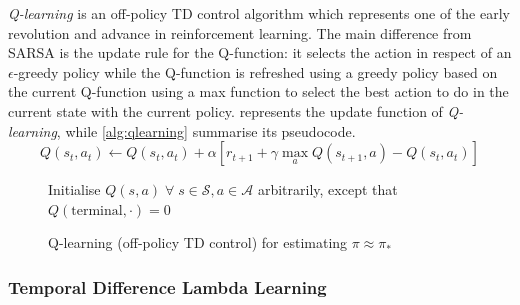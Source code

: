 \textit{Q-learning} \cite{watkins1989learning} is an off-policy TD control algorithm which represents one of the early revolution and advance in reinforcement learning.
The main difference from SARSA is the update rule for the Q-function: it selects the action in respect of an $\epsilon$-greedy policy while the Q-function is refreshed using a greedy policy based on the current Q-function using a max function to select the best action to do in the current state with the current policy.
 represents the update function of \textit{Q-learning}, while \vref{alg:qlearning} summarise its pseudocode.
\begin{equation}\label{eq:qlearning}
	Q(s_t, a_t) \leftarrow Q(s_t, a_t) + \alpha [r_{t+1} + \gamma \max_{a}{Q(s_{t+1}, a)} - Q(s_t, a_t)]
\end{equation}
\begin{figure}

	\begin{algorithm}[H]
		\SetAlgoLined
		\DontPrintSemicolon
		\LinesNumbered
		\KwIn{step size $\alpha \in (0,1]$, small $\epsilon > 0$\;}
		Initialise $Q(s,a) \; \forall\; s \in \mathcal{S}, a \in \mathcal{A}$ arbitrarily, except that $Q(\text{terminal}, \cdot) = 0$\;
		\caption{Q-learning (off-policy TD control) for estimating $\pi \approx \pi_*$}
		\label{alg:qlearning}
	\end{algorithm}
\end{figure}

\subsubsection{Temporal Difference Lambda Learning}

